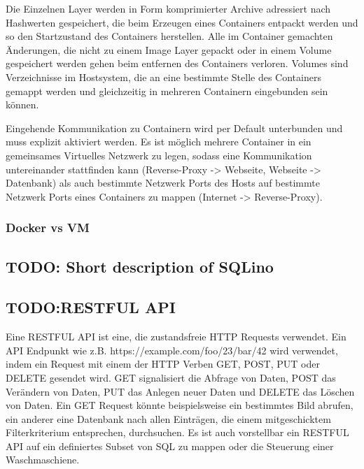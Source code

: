Die Einzelnen Layer werden in Form komprimierter Archive adressiert
nach Hashwerten gespeichert, die beim Erzeugen eines Containers
entpackt werden und so den Startzustand des Containers
herstellen. Alle im Container gemachten Änderungen, die nicht zu einem
Image Layer gepackt oder in einem Volume gespeichert werden gehen beim
entfernen des Containers verloren. Volumes sind Verzeichnisse im
Hostsystem, die an eine bestimmte Stelle des Containers gemappt werden
und gleichzeitig in mehreren Containern eingebunden sein können.

Eingehende Kommunikation zu Containern wird per Default unterbunden
und muss explizit aktiviert werden. Es ist möglich mehrere Container
in ein gemeinsames Virtuelles Netzwerk zu legen, sodass eine
Kommunikation untereinander stattfinden kann (Reverse-Proxy ->
Webseite, Webseite -> Datenbank) als auch bestimmte Netzwerk Ports des
Hosts auf bestimmte Netzwerk Ports eines Containers zu mappen
(Internet -> Reverse-Proxy).


\subsubsection{Docker vs VM}


\subsection{TODO: Short description of SQLino}

\subsection{TODO:RESTFUL API} Eine RESTFUL API ist eine, die
zustandsfreie HTTP Requests verwendet. Ein API
Endpunkt wie
z.B. https://example.com/foo/23/bar/42 wird verwendet, indem ein
Request mit einem der HTTP Verben GET, POST, PUT oder DELETE gesendet
wird.  GET signalisiert die Abfrage von Daten, POST das Verändern von
Daten, PUT das Anlegen neuer Daten und DELETE das Löschen von
Daten. Ein GET Request könnte beispielsweise ein bestimmtes Bild
abrufen, ein anderer eine Datenbank nach allen Einträgen, die einem
mitgeschicktem Filterkriterium entsprechen, durchsuchen. Es ist auch
vorstellbar ein RESTFUL API auf ein definiertes Subset von SQL zu
mappen oder die Steuerung einer Waschmaschiene.

